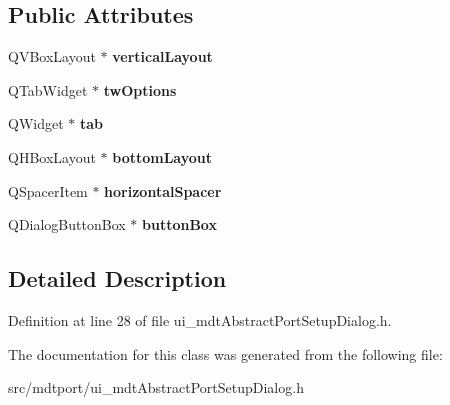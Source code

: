 \subsection*{Public Attributes}
\begin{DoxyCompactItemize}
\item 
\hypertarget{class_ui__mdt_abstract_port_setup_dialog_a5f13974f4b030a8486d72cb6fbf9aecd}{
QVBoxLayout $\ast$ {\bfseries verticalLayout}}
\label{class_ui__mdt_abstract_port_setup_dialog_a5f13974f4b030a8486d72cb6fbf9aecd}

\item 
\hypertarget{class_ui__mdt_abstract_port_setup_dialog_a8899515ed81958f46dc447309a430f6d}{
QTabWidget $\ast$ {\bfseries twOptions}}
\label{class_ui__mdt_abstract_port_setup_dialog_a8899515ed81958f46dc447309a430f6d}

\item 
\hypertarget{class_ui__mdt_abstract_port_setup_dialog_a5c47790e1dd3789176f6967f60eb49b8}{
QWidget $\ast$ {\bfseries tab}}
\label{class_ui__mdt_abstract_port_setup_dialog_a5c47790e1dd3789176f6967f60eb49b8}

\item 
\hypertarget{class_ui__mdt_abstract_port_setup_dialog_a28b9abfda3eb1703b3bcb8f4c5dcaae9}{
QHBoxLayout $\ast$ {\bfseries bottomLayout}}
\label{class_ui__mdt_abstract_port_setup_dialog_a28b9abfda3eb1703b3bcb8f4c5dcaae9}

\item 
\hypertarget{class_ui__mdt_abstract_port_setup_dialog_aed3bc5d4d007d0646bc95c7a07328b85}{
QSpacerItem $\ast$ {\bfseries horizontalSpacer}}
\label{class_ui__mdt_abstract_port_setup_dialog_aed3bc5d4d007d0646bc95c7a07328b85}

\item 
\hypertarget{class_ui__mdt_abstract_port_setup_dialog_a2bea54262494fb607a2593ce826df146}{
QDialogButtonBox $\ast$ {\bfseries buttonBox}}
\label{class_ui__mdt_abstract_port_setup_dialog_a2bea54262494fb607a2593ce826df146}

\end{DoxyCompactItemize}


\subsection{Detailed Description}


Definition at line 28 of file ui\_\-mdtAbstractPortSetupDialog.h.



The documentation for this class was generated from the following file:\begin{DoxyCompactItemize}
\item 
src/mdtport/ui\_\-mdtAbstractPortSetupDialog.h\end{DoxyCompactItemize}
